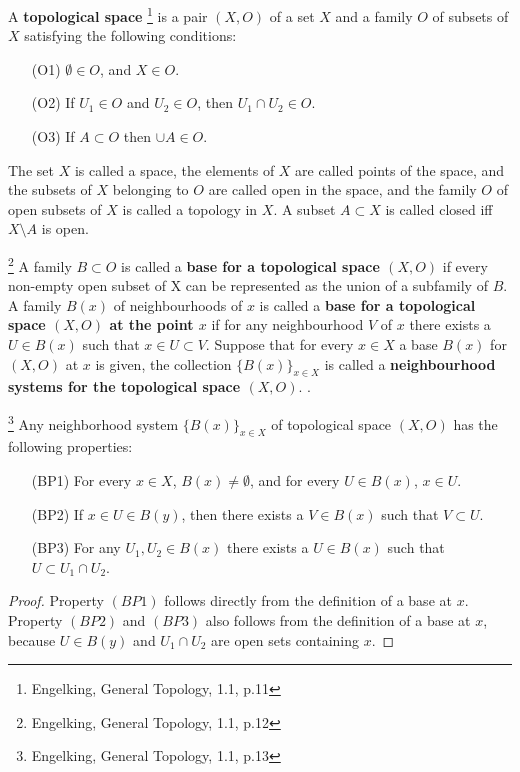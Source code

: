 \begin{definition} \label{D:topo}
A \textbf{topological space} 
\footnote{Engelking, General Topology, 1.1, p.11}
is a pair $(X,O)$ of a set $X$ and a family $O$ of
subsets of $X$ satisfying the following conditions:
\begin{enumerate}
  \item[(O1)] $\emptyset\in O$, and $X\in O$.
  \item[(O2)] If $U_1\in O$ and $U_2\in O$, then $U_1\cap U_2\in O$.
  \item[(O3)] If $A\subset O$ then $\cup A\in O$.
\end{enumerate}
The set $X$ is called a space, the elements of $X$ are called points of the
space, and the subsets of $X$ belonging to $O$ are called open in the space, and
the family $O$ of open subsets of $X$ is called a topology in $X$. A subset
$A\subset X$ is called closed iff $X\setminus A$ is open.
\end{definition}


\begin{definition} 
\footnote{Engelking, General Topology, 1.1, p.12}
A family $B\subset O$ is called a \textbf{base for a topological space $(X,O)$}
if every non-empty open subset of X can be represented as the union of a
subfamily of $B$. A family $B(x)$ of neighbourhoods of $x$ is called a 
\textbf{base for a topological space $(X,O)$ at the point $x$}
if for any neighbourhood $V$ of $x$ there exists a $U\in B(x)$ such that 
$x\in U\subset V$. Suppose that for every $x\in X$ a base $B(x)$ for $(X,O)$ at 
$x$ is given, the collection $\{B(x)\}_{x\in X}$ is called a 
\textbf{neighbourhood systems for the topological space $(X,O)$}. 
. 
\end{definition}


\begin{proposition} \label{P:neigh_sys}
\footnote{Engelking, General Topology, 1.1, p.13}
Any neighborhood system $\{B(x)\}_{x\in X}$ of topological space $(X,O)$ has the
following properties:
\begin{enumerate}
  \item[(BP1)] For every $x\in X$, $B(x)\neq \emptyset$, and for every 
    $U\in B(x)$, $x\in U$.
  \item[(BP2)] If $x\in U\in B(y)$, then there exists a $V\in B(x)$ such that
    $V\subset U$.
  \item[(BP3)] For any $U_1,U_2\in B(x)$ there exists a $U\in B(x)$ such that
    $U\subset U_1\cap U_2$.
\end{enumerate}
\end{proposition}
\begin{proof}
Property $(BP1)$ follows directly from the definition of a base at $x$. Property
$(BP2)$ and $(BP3)$ also follows from the definition of a base at $x$, because
$U\in B(y)$ and $U_1\cap U_2$ are open sets containing $x$.
\end{proof}


